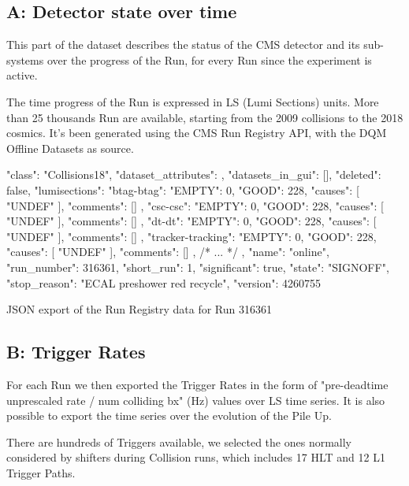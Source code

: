 \subsection{A: Detector state over time}

This part of the dataset describes the status of the CMS detector and its sub-systems over the progress of the Run, for every Run since the experiment is active.

The time progress of the Run is expressed in LS (Lumi Sections) units. More than 25 thousands Run are available, starting from the 2009 collisions to the 2018 cosmics. It's been generated using the CMS Run Registry API, with the DQM Offline Datasets as source.

\begin{listing}[H]
\begin{jsoncode}
  {
    "class": "Collisions18",
    "dataset_attributes": {},
    "datasets_in_gui": [],
    "deleted": false,
    "lumisections": {
      "btag-btag": {
        "EMPTY": 0,
        "GOOD": 228,
        "causes": [
          "UNDEF"
        ],
        "comments": []
      },
      "csc-csc": {
        "EMPTY": 0,
        "GOOD": 228,
        "causes": [
          "UNDEF"
        ],
        "comments": []
      },
      "dt-dt": {
        "EMPTY": 0,
        "GOOD": 228,
        "causes": [
          "UNDEF"
        ],
        "comments": []
      },
      "tracker-tracking": {
        "EMPTY": 0,
        "GOOD": 228,
        "causes": [
          "UNDEF"
        ],
        "comments": []
      },
      /* ... */
    },
    "name": "online",
    "run_number": 316361,
    "short_run": 1,
    "significant": true,
    "state": "SIGNOFF",
    "stop_reason": "ECAL preshower red recycle",
    "version": 4260755
  }
\end{jsoncode}
\caption{JSON export of the Run Registry data for Run 316361}
\end{listing}

\subsection{B: Trigger Rates}

For each Run we then exported the Trigger Rates in the form of "pre-deadtime unprescaled rate / num colliding bx" (Hz) values over LS time series. It is also possible to export the time series over the evolution of the Pile Up.

There are hundreds of Triggers available, we selected the ones normally considered by shifters during Collision runs, which includes 17 HLT and 12 L1 Trigger Paths.

